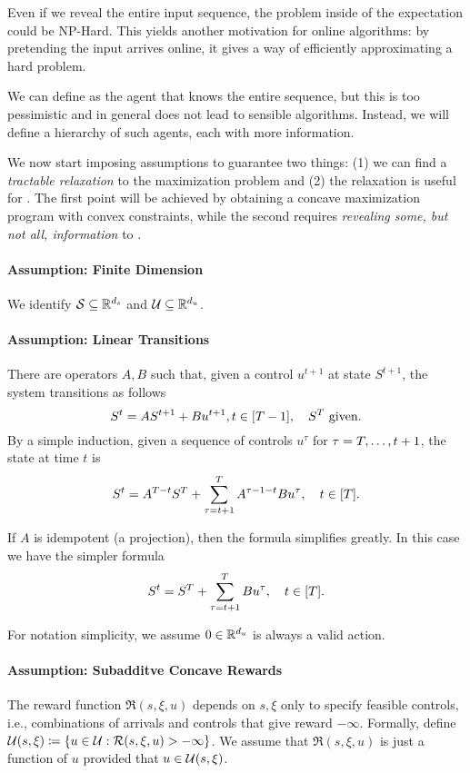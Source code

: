\documentclass[letterpaper,11pt]{article}
\begin{document}
Even if we reveal the entire input sequence, the problem inside of the expectation could be NP-Hard.
This yields another motivation for online algorithms: by pretending the input arrives online, it gives a way of efficiently approximating a hard problem.

We can define \off as the agent that knows the entire sequence, but this is too pessimistic and in general does not lead to sensible algorithms.
Instead, we will define a hierarchy of such agents, each with more information.

We now start imposing assumptions to guarantee two things: (1) we can find a \emph{tractable relaxation} to the maximization problem and (2) the relaxation is useful for \onl.
The first point will be achieved by obtaining a concave maximization program with convex constraints, while the second requires \emph{revealing some, but not all, information} to \off.

\paragraph{Assumption: Finite Dimension}
We identify $\mathcal{S}\subseteq \mathbb{R}^{d_s}$ and $\mathcal{U}\subseteq\mathbb{R}^{d_u}$.

\paragraph{Assumption: Linear Transitions}
There are operators $A,B$ such that, given a control $u^{t+1}$ at state $S^{t+1}$, the system transitions as follows
\[
S^{t} = AS^{t+1} + Bu^{t+1}, t\in[T-1], \quad 
S^T \text{ given}.
\]
By a simple induction, given a sequence of controls $u^\tau$ for $\tau=T,\ldots,t+1$, the state at time $t$ is
\[
S^t = A^{T-t}S^T + \sum_{\tau=t+1}^T A^{\tau-1-t}Bu^\tau, \quad t\in[T].
\]

If $A$ is idempotent (a projection), then the formula simplifies greatly.
In this case we have the simpler formula
\begin{equation}\label{eq:linear_state}
S^t = S^T + \sum_{\tau=t+1}^T Bu^\tau, \quad t\in[T].
\end{equation}

For notation simplicity, we assume $0\in \mathbb{R}^{d_u}$ is always a valid action.

\paragraph{Assumption: Subadditve Concave Rewards}
The reward function $\Re(s,\xi,u)$ depends on $s,\xi$ only to specify feasible controls, i.e., combinations of arrivals and controls that give reward $-\infty$.
Formally, define $\mathcal{U}(s,\xi)\coloneqq \{u\in\mathcal{U}: \mathcal{R}(s,\xi,u)>-\infty\}$.
We assume that $\Re(s,\xi,u)$ is just a function of $u$ provided that $u\in\mathcal{U}(s,\xi)$.
\end{document}
